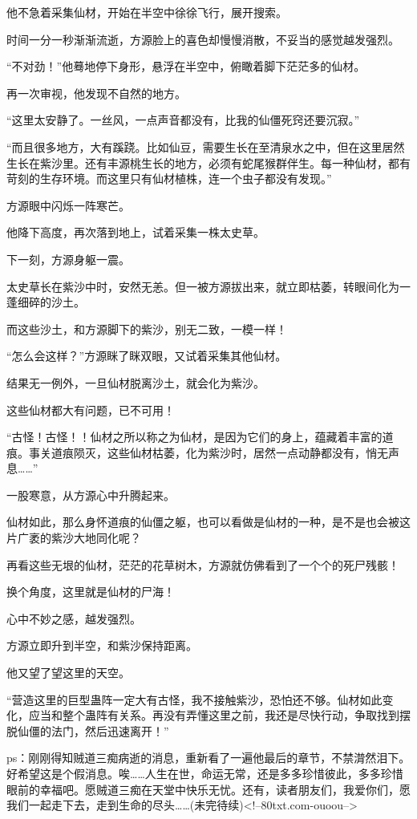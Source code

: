 \begin{this_body}
他不急着采集仙材，开始在半空中徐徐飞行，展开搜索。

时间一分一秒渐渐流逝，方源脸上的喜色却慢慢消散，不妥当的感觉越发强烈。

“不对劲！”他蓦地停下身形，悬浮在半空中，俯瞰着脚下茫茫多的仙材。

再一次审视，他发现不自然的地方。

“这里太安静了。一丝风，一点声音都没有，比我的仙僵死窍还要沉寂。”

“而且很多地方，大有蹊跷。比如仙豆，需要生长在至清泉水之中，但在这里居然生长在紫沙里。还有丰源桃生长的地方，必须有蛇尾猴群伴生。每一种仙材，都有苛刻的生存环境。而这里只有仙材植株，连一个虫子都没有发现。”

方源眼中闪烁一阵寒芒。

他降下高度，再次落到地上，试着采集一株太史草。

下一刻，方源身躯一震。

太史草长在紫沙中时，安然无恙。但一被方源拔出来，就立即枯萎，转眼间化为一蓬细碎的沙土。

而这些沙土，和方源脚下的紫沙，别无二致，一模一样！

“怎么会这样？”方源眯了眯双眼，又试着采集其他仙材。

结果无一例外，一旦仙材脱离沙土，就会化为紫沙。

这些仙材都大有问题，已不可用！

“古怪！古怪！！仙材之所以称之为仙材，是因为它们的身上，蕴藏着丰富的道痕。事关道痕陨灭，这些仙材枯萎，化为紫沙时，居然一点动静都没有，悄无声息……”

一股寒意，从方源心中升腾起来。

仙材如此，那么身怀道痕的仙僵之躯，也可以看做是仙材的一种，是不是也会被这片广袤的紫沙大地同化呢？

再看这些无垠的仙材，茫茫的花草树木，方源就仿佛看到了一个个的死尸残骸！

换个角度，这里就是仙材的尸海！

心中不妙之感，越发强烈。

方源立即升到半空，和紫沙保持距离。

他又望了望这里的天空。

“营造这里的巨型蛊阵一定大有古怪，我不接触紫沙，恐怕还不够。仙材如此变化，应当和整个蛊阵有关系。再没有弄懂这里之前，我还是尽快行动，争取找到摆脱仙僵的法门，然后迅速离开！”

ps：刚刚得知贼道三痴病逝的消息，重新看了一遍他最后的章节，不禁潸然泪下。好希望这是个假消息。唉……人生在世，命运无常，还是多多珍惜彼此，多多珍惜眼前的幸福吧。愿贼道三痴在天堂中快乐无忧。还有，读者朋友们，我爱你们，愿我们一起走下去，走到生命的尽头……(未完待续)<!--80txt.com-ouoou-->

\end{this_body}

